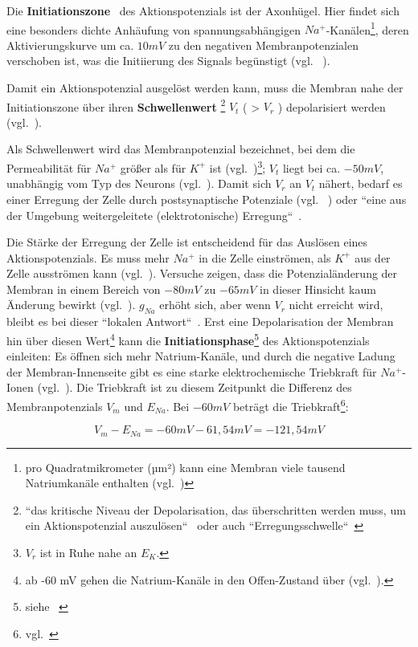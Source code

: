 {Die \textbf{Initiationszone}~\cite[111]{BCP18} des Aktionspotenzials ist der Axonhügel. Hier findet sich eine besonders dichte Anhäufung von spannungsabhängigen $Na^+$-Kanälen\footnote{
 pro Quadratmikrometer (µm²) kann eine Membran viele tausend Natriumkanäle enthalten (vgl.~\cite[99]{BCP18})
}, deren Aktivierungskurve um ca. $10 mV$ zu den negativen Membranpotenzialen verschoben ist, was die Initiierung des Signals begünstigt (vgl. ~\cite[77]{Jon19}).

Damit ein Aktionspotenzial ausgelöst werden kann, muss die Membran nahe der Initiationszone über ihren \textbf{Schwellenwert} \footnote{
 ``das kritische Niveau der Depolarisation, das überschritten werden muss, um ein Aktionspotenzial auszulösen``~\cite[88]{BCP18} oder auch ``Erregungsschwelle``~\cite[69]{FE19}
} $V_t$ ( > $V_r$ ) depolarisiert werden (vgl.~\cite[111]{BCP18}).


 Als Schwellenwert wird das Membranpotenzial bezeichnet, bei dem die Permeabilität für $Na^+$ größer als für $K^+$ ist (vgl.~\cite[103]{BCP18})\footnote{$V_r$ ist in Ruhe nahe an $E_K$.}; $V_t$ liegt bei ca. $- 50mV$, unabhängig vom Typ des Neurons (vgl.~\cite[75]{Jon19}).
 Damit sich $V_r$ an $V_t$ nähert, bedarf es einer Erregung der Zelle durch postsynaptische Potenziale (vgl. ~\cite[69]{FE19}) oder ``eine aus der Umgebung weitergeleitete (elektrotonische) Erregung``~\cite[46]{SD07}.

Die Stärke der Erregung der Zelle ist entscheidend für das Auslösen eines Aktionspotenzials. Es muss mehr $Na^+$ in die Zelle einströmen, als $K^+$ aus der Zelle ausströmen kann (vgl.~\cite[69]{FE19}).
Versuche zeigen, dass die Potenzialänderung der Membran in einem Bereich von $-80 mV$ zu $-65 mV$ in dieser Hinsicht kaum Änderung bewirkt (vgl.~\cite[99]{BCP18}). $g_{Na}$ erhöht sich, aber wenn $V_r$ nicht erreicht wird, bleibt es bei dieser ``lokalen Antwort``~\cite[46]{SD07}. Erst eine Depolarisation der Membran hin über diesen Wert\footnote{
 ab -60 mV gehen die Natrium-Kanäle in den Offen-Zustand über (vgl.~\cite[69]{FE19}).
} kann die \textbf{Initiationsphase}\footnote{siehe ~\cite[68]{FE19}} des Aktionspotenzials einleiten: Es öffnen sich mehr Natrium-Kanäle, und durch die negative Ladung der Membran-Innenseite gibt es eine starke elektrochemische Triebkraft für $Na^+$-Ionen (vgl.~\cite[103]{BCP18}). Die Triebkraft ist zu diesem Zeitpunkt die Differenz des Membranpotenzials $V_m$ und $E_{Na}$. Bei $-60 mV$ beträgt die Triebkraft\footnote{
 vgl.~\cite[39]{Fak19}
}:

 \begin{equation}
  V_m - E_{Na} = -60 mV - 61,54 mV = -121,54 mV
  \label{eq:gl-triebkraft}
 \end{equation}


}
